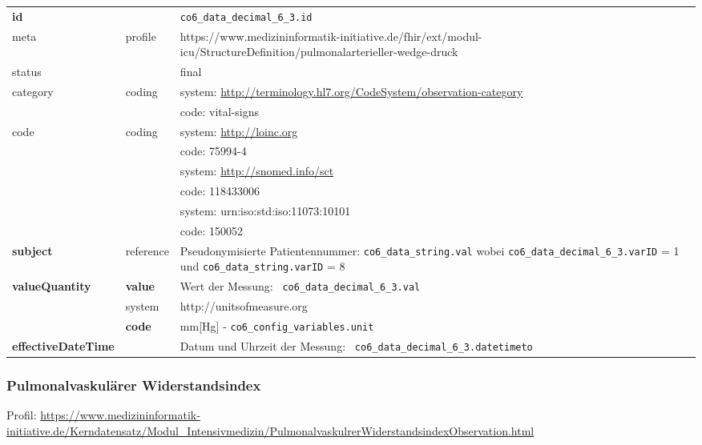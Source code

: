 \begin{longtable}{|l|l|p{7.5cm}|}
        \hline
        \rowcolor{lightgray} \multicolumn{3}{|l|}{Data Mapping (inhaltlich)} \\ \hline
        \textbf{id} &  & \texttt{co6\_data\_decimal\_6\_3.id} \\ \hline
	meta & profile & https://www.medizininformatik-initiative.de/fhir/ext/modul-icu/StructureDefinition/pulmonalarterieller-wedge-druck \\ \hline 
	status &  & final   \\ \hline 
	category & coding & system: \url{http://terminology.hl7.org/CodeSystem/observation-category} \\
\cline{3-3}
	& & code: vital-signs\\ \hline
	code & coding & system: \url{http://loinc.org} \\ 
	\cline{3-3} 
	&  & code: 75994-4 \\ 
	\cline{3-3} 
	&  & system: \url{http://snomed.info/sct} \\ 
	\cline{3-3}
	&  & code: 118433006 \\ 
	\cline{3-3} 
	&  & system: urn:iso:std:iso:11073:10101 \\ 
	\cline{3-3}
	&  & code: 150052 \\ \hline
	 \textbf{subject} & reference & Pseudonymisierte Patientennummer: \texttt{co6\_data\_string.val} wobei \texttt{co6\_data\_decimal\_6\_3.varID} = 1 und \texttt{co6\_data\_string.varID} = 8 \\ \hline
	 \textbf{valueQuantity}  & \textbf{value} & Wert der Messung: \texttt{
co6\_data\_decimal\_6\_3.val} \\
        \cline{2-3}
         & system & http://unitsofmeasure.org \\
         \cline{2-3}
         & \textbf{code} & mm[Hg] - \texttt{co6\_config\_variables.unit} \\ \hline
     \textbf{effectiveDateTime}  & & Datum und Uhrzeit der Messung: \texttt{
co6\_data\_decimal\_6\_3.datetimeto} \\
   \hline
\end{longtable}

\subsubsection{Pulmonalvaskulärer Widerstandsindex} 

Profil: \url{https://www.medizininformatik-initiative.de/Kerndatensatz/Modul_Intensivmedizin/PulmonalvaskulrerWiderstandsindexObservation.html}

